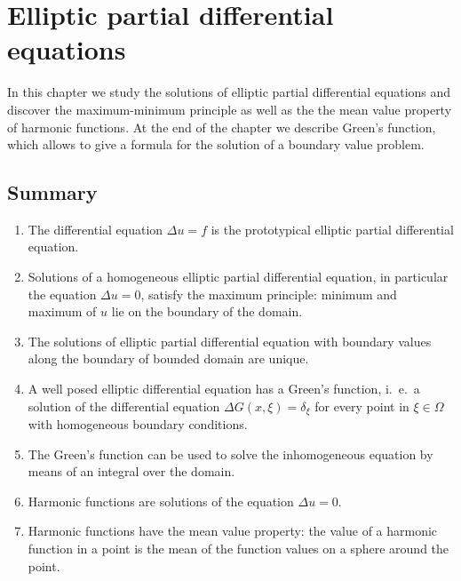 %
%
%
\chapter{Elliptic partial differential equations
\label{chapter:elliptic}}
In this chapter we study the solutions of elliptic partial differential
equations and discover the maximum-minimum principle as well as the
the mean value property of harmonic functions.
At the end of the chapter we describe Green's function, which allows
to give a formula for the solution of a boundary value problem.









\section{Summary}
\begin{enumerate}
\item
The differential equation $\Delta u=f$ is the prototypical elliptic
partial differential equation.
\item
Solutions of a homogeneous elliptic partial differential equation,
in particular the equation $\Delta u=0$, satisfy the maximum principle:
minimum and maximum of $u$ lie on the boundary of the domain.
\item
The solutions of elliptic partial differential equation with boundary
values along the boundary of bounded domain are unique.
\item
A well posed elliptic differential equation has a Green's function,
i.~e.~a solution of the differential equation
$\Delta G(x,\xi)=\delta_\xi$ for every point in $\xi\in\Omega$
with homogeneous boundary conditions.
\item
The Green's function can be used to solve the inhomogeneous equation
by means of an integral over the domain.
\item
Harmonic functions are solutions of the equation $\Delta u=0$.
\item
Harmonic functions have the mean value property: the value of a harmonic
function in a point is the mean of the function values on a sphere around
the point.
\end{enumerate}



